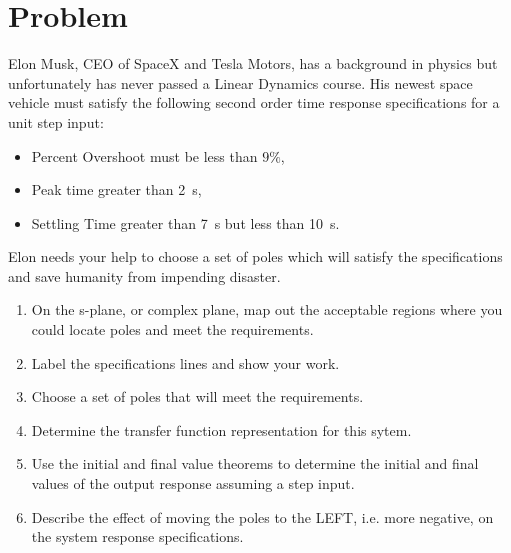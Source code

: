 \documentclass[titlepage, 11pt, reqno]{article}    %
\begin{document}
\section{Problem}\label{prob:sys_response_to_poles}
Elon Musk, CEO of SpaceX and Tesla Motors, has a background in physics but unfortunately has never passed a Linear Dynamics course. 
His newest space vehicle must satisfy the following second order time response specifications for a unit step input:
\begin{itemize}
    \item Percent Overshoot must be less than \(9 \%\),
    \item Peak time greater than \SI{2}{\second},
    \item Settling Time greater than \SI{7}{\second} but less than \SI{10}{\second}.
\end{itemize}
Elon needs your help to choose a set of poles which will satisfy the specifications and save humanity from impending disaster.
\begin{enumerate}
    \item On the s-plane, or complex plane, map out the acceptable regions where you could locate poles and meet the requirements. 
    \item Label the specifications lines and show your work.
    \item Choose a set of poles that will meet the requirements.
    \item Determine the transfer function representation for this sytem.
    \item Use the initial and final value theorems to determine the initial and final values of the output response assuming a step input.
    \item Describe the effect of moving the poles to the LEFT, i.e. more negative, on the system response specifications.
\end{enumerate}

\begin{figure*}[htbp]
\centering
\begin{scaletikzpicturetowidth}{0.95\textwidth}
\end{scaletikzpicturetowidth}
\end{figure*}
\end{document}

